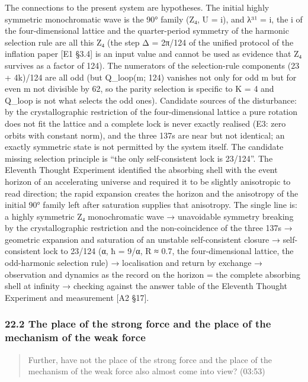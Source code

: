 \documentclass[
  a4paper,
]{article}
\begin{document}
The connections to the present system are hypotheses. The initial highly
symmetric monochromatic wave is the 90° family (Z₄, U = i), and λ³¹ = i,
the i of the four-dimensional lattice and the quarter-period symmetry of
the harmonic selection rule are all this Z₄ (the step Δ = 2π/124 of the
unified protocol of the inflation paper {[}E1 §3.4{]} is an input value
and cannot be used as evidence that Z₄ survives as a factor of 124). The
numerators of the selection-rule components (23 + 4k)/124 are all odd
(but Q\_loop(m; 124) vanishes not only for odd m but for even m not
divisible by 62, so the parity selection is specific to K = 4 and
Q\_loop is not what selects the odd ones). Candidate sources of the
disturbance: by the crystallographic restriction of the four-dimensional
lattice a pure rotation does not fit the lattice and a complete lock is
never exactly realised (E3: zero orbits with constant norm), and the
three 137s are near but not identical; an exactly symmetric state is not
permitted by the system itself. The candidate missing selection
principle is ``the only self-consistent lock is 23/124''. The Eleventh
Thought Experiment identified the absorbing shell with the event horizon
of an accelerating universe and required it to be slightly anisotropic
to read direction; the rapid expansion creates the horizon and the
anisotropy of the initial 90° family left after saturation supplies that
anisotropy. The single line is: a highly symmetric Z₄ monochromatic wave
→ unavoidable symmetry breaking by the crystallographic restriction and
the non-coincidence of the three 137s → geometric expansion and
saturation of an unstable self-consistent closure → self-consistent lock
to 23/124 (α, ħ = 9/α, R ≈ 0.7, the four-dimensional lattice, the
odd-harmonic selection rule) → localisation and return by exchange →
observation and dynamics as the record on the horizon = the complete
absorbing shell at infinity → checking against the answer table of the
Eleventh Thought Experiment and measurement {[}A2 §17{]}.

\subsubsection{22.2 The place of the strong force and the place of the
mechanism of the weak
force}\label{the-place-of-the-strong-force-and-the-place-of-the-mechanism-of-the-weak-force}

\begin{quote}
Further, have not the place of the strong force and the place of the
mechanism of the weak force also almost come into view? (03:53)
\end{quote}
\end{document}
